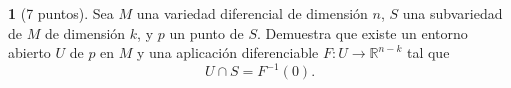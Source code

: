 \documentclass[12pt,a4paper]{report}
\theoremstyle{definition}
\newtheorem{ex}{}
\newcommand{\RR}{\ensuremath{\mathbb R}}
\begin{document}
\begin{ex}[7 puntos]
Sea $M$ una variedad diferencial de dimensi\'on $n$, $S$  una subvariedad de $M$ de dimensi\'on $k$, y $p$ un punto de $S$. Demuestra que existe un entorno abierto $U$ de $p$ en $M$ y una aplicaci\'on diferenciable $F \colon U \to \RR^{n-k}$ tal que
$$U\cap S= F^{-1}(0).$$
\end{ex}

 







 
\end{document}
